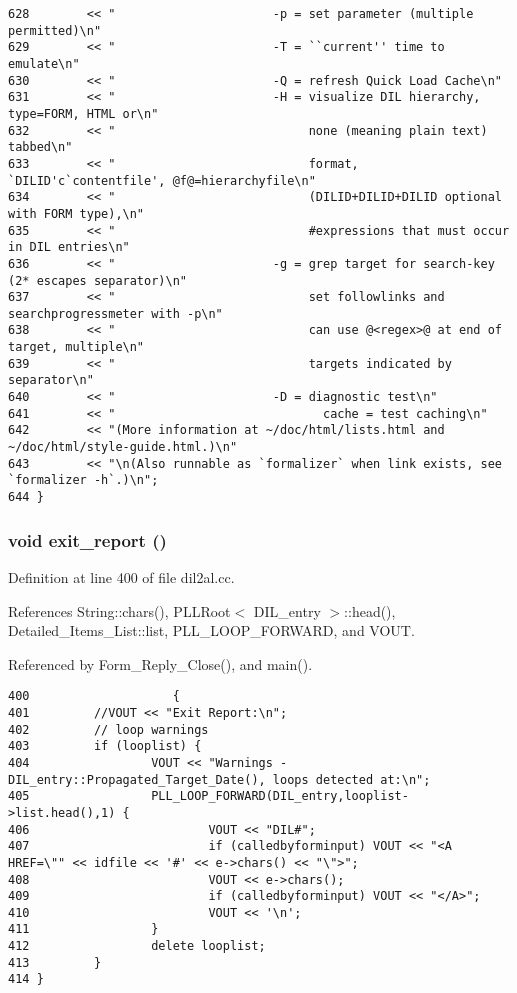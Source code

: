 \begin{verbatim}
628        << "                      -p = set parameter (multiple permitted)\n"
629        << "                      -T = ``current'' time to emulate\n"
630        << "                      -Q = refresh Quick Load Cache\n"
631        << "                      -H = visualize DIL hierarchy, type=FORM, HTML or\n"
632        << "                           none (meaning plain text) tabbed\n"
633        << "                           format, `DILID'c`contentfile', @f@=hierarchyfile\n"
634        << "                           (DILID+DILID+DILID optional with FORM type),\n"
635        << "                           #expressions that must occur in DIL entries\n"
636        << "                      -g = grep target for search-key (2* escapes separator)\n"
637        << "                           set followlinks and searchprogressmeter with -p\n"
638        << "                           can use @<regex>@ at end of target, multiple\n"
639        << "                           targets indicated by separator\n"
640        << "                      -D = diagnostic test\n"
641        << "                             cache = test caching\n"
642        << "(More information at ~/doc/html/lists.html and ~/doc/html/style-guide.html.)\n"
643        << "\n(Also runnable as `formalizer` when link exists, see `formalizer -h`.)\n";
644 }
\end{verbatim}\normalsize 
{}
\subsubsection{\setlength{\rightskip}{0pt plus 5cm}void exit\_\-report ()}\label{dil2al_8cc_a105}




Definition at line 400 of file dil2al.cc.

References String::chars(), PLLRoot$<$ DIL\_\-entry $>$::head(), Detailed\_\-Items\_\-List::list, PLL\_\-LOOP\_\-FORWARD, and VOUT.

Referenced by Form\_\-Reply\_\-Close(), and main().



\footnotesize\begin{verbatim}400                    {
401         //VOUT << "Exit Report:\n";
402         // loop warnings
403         if (looplist) {
404                 VOUT << "Warnings - DIL_entry::Propagated_Target_Date(), loops detected at:\n";
405                 PLL_LOOP_FORWARD(DIL_entry,looplist->list.head(),1) {
406                         VOUT << "DIL#";
407                         if (calledbyforminput) VOUT << "<A HREF=\"" << idfile << '#' << e->chars() << "\">";
408                         VOUT << e->chars();
409                         if (calledbyforminput) VOUT << "</A>";
410                         VOUT << '\n';
411                 }
412                 delete looplist;
413         }
414 }
\end{verbatim}\normalsize 
{}
